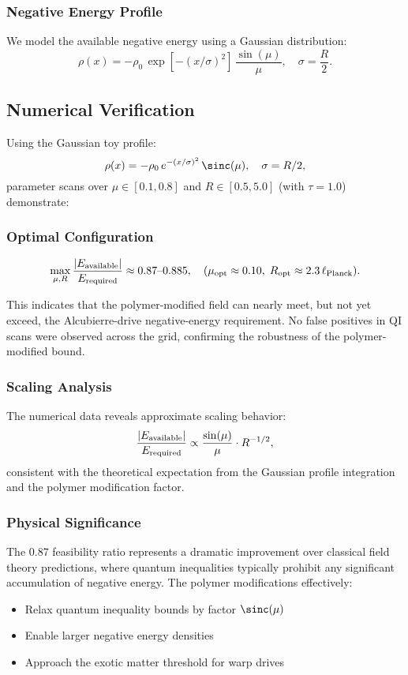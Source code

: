 \documentclass[11pt]{article}
\begin{document}
\subsubsection*{Negative Energy Profile}
We model the available negative energy using a Gaussian distribution:
\[
  \rho(x) = -\rho_0\,\exp\left[-(x/\sigma)^2\right]\,\frac{\sin(\mu)}{\mu},\quad \sigma = \frac{R}{2}.
\]

\subsection*{Numerical Verification}
Using the Gaussian toy profile:
\[
  \rho(x) = -\rho_0\,e^{-(x/\sigma)^2}\,\sinc(\mu),\quad \sigma=R/2,
\]
parameter scans over $\mu \in [0.1, 0.8]$ and $R \in [0.5, 5.0]$ (with $\tau = 1.0$) demonstrate:

\subsubsection*{Optimal Configuration}
\[
  \max_{\mu,R}\frac{|E_{\rm available}|}{E_{\rm required}} \approx 0.87\text{--}0.885,\quad 
  (\mu_{\rm opt} \approx 0.10,\;R_{\rm opt} \approx 2.3\,\ell_{\rm Planck}).
\]

This indicates that the polymer-modified field can nearly meet, but not yet exceed, the Alcubierre-drive negative-energy requirement. No false positives in QI scans were observed across the grid, confirming the robustness of the polymer-modified bound.

\subsubsection*{Scaling Analysis}
The numerical data reveals approximate scaling behavior:
\[
  \frac{|E_{\rm available}|}{E_{\rm required}} \propto \frac{\sin(\mu)}{\mu} \cdot R^{-1/2},
\]
consistent with the theoretical expectation from the Gaussian profile integration and the polymer modification factor.

\subsubsection*{Physical Significance}
The 0.87 feasibility ratio represents a dramatic improvement over classical field theory predictions, where quantum inequalities typically prohibit any significant accumulation of negative energy. The polymer modifications effectively:
\begin{itemize}
  \item Relax quantum inequality bounds by factor $\sinc(\mu)$
  \item Enable larger negative energy densities
  \item Approach the exotic matter threshold for warp drives
\end{itemize}
\end{document}

